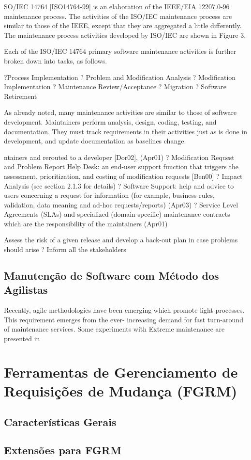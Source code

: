 SO/IEC 14764 [ISO14764-99]
is an elaboration of the
IEEE/EIA 12207.0-96 maintenance process. The activities of the ISO/IEC maintenance process are
similar to those of the IEEE, except that they are aggregated a little differently. The maintenance
process activities developed by ISO/IEC are shown in Figure 3.

Each of the ISO/IEC 14764 primary software maintenance activities is further broken down into tasks,
as follows.

?Process Implementation ? Problem and Modification Analysis ? Modification Implementation ?
Maintenance Review/Acceptance ? Migration ? Software Retirement

As already noted, many maintenance activities are similar to those of software development.
Maintainers perform analysis, design, coding, testing, and documentation. They must track
requirements in their activities just as is done in development, and update
documentation as
baselines
change.

ntainers and rerouted to a developer
[Dor02],
(Apr01)
? Modification Request and Problem Report Help Desk: an end-user support function that triggers the
assessment, prioritization, and costing
of
modification requests [Ben00]
? Impact Analysis (see section 2.1.3 for details) ? Software Support: help
and advice to users
concerning a request for information (for example, business rules, validation, data meaning and
ad-hoc requests/reports) (Apr03)
? Service Level Agreements (SLAs) and specialized (domain-specific) maintenance contracts which are
the responsibility of the maintainers (Apr01)


Assess the risk of a given release and develop a back-out plan in case problems should arise
? Inform all the stakeholders

\subsection{Manutenção de Software com Método dos Agilistas}
\label{sub:manutenção_de_software_com_método_dos_agilistas}

Recently, agile methodologies have been emerging which promote light processes. This requirement
emerges from the ever- increasing demand for
fast turn-around of maintenance
services. Some experiments with Extreme maintenance are presented in

\section{Ferramentas de Gerenciamento de Requisições de Mudança (FGRM)}
\label{sec:ferramentas_de_gerenciameto_de_requisições_de_mudança}

\subsection{Características Gerais}
\label{subsec:caracteristicas_gerais}

\subsection{Extensões para FGRM}
\label{subsec:extensoes_para_fgrm}







